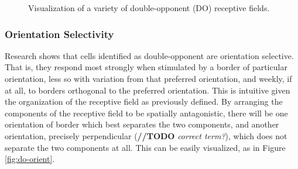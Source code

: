 \documentclass[journal,onecolumn]{IEEEtran}
\begin{document}
\begin{figure}[H]
    \caption{Visualization of a variety of double-opponent (DO) receptive fields.}
    \label{fig:rf-do}
\end{figure}


\subsubsection*{Orientation Selectivity}

Research shows that cells identified as double-opponent are orientation selective. That is, they respond most strongly when stimulated by a border of particular orientation, less so with variation from that preferred orientation, and weekly, if at all, to borders orthogonal to the preferred orientation. This is intuitive given the organization of the receptive field as previously defined. By arranging the components of the receptive field to be spatially antagonistic, there will be one orientation of border which best separates the two components, and another orientation, precisely perpendicular (\textbf{//TODO} \textit{correct term?}), which does not separate the two components at all. This can be easily visualized, as in Figure \ref{fig:do-orient}.
\end{document}
